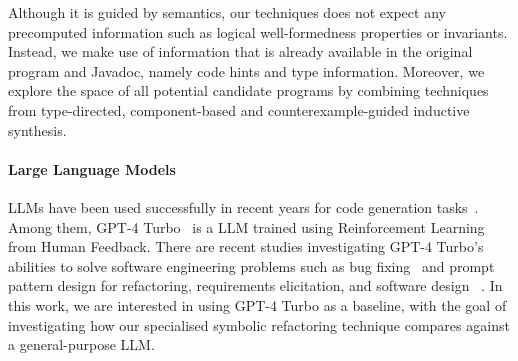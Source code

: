 \documentclass[sigconf,review,anonymous]{acmart}
\begin{document}
%
%
%

Although it is guided by semantics, our techniques does not expect any
precomputed information such as logical well-formedness properties or
invariants. Instead, we make use of information that is already
available in the original program and Javadoc, namely code hints and
type information. Moreover, we explore the space of all potential
candidate programs by combining techniques from type-directed,
component-based and counterexample-guided inductive synthesis.

\paragraph{Large Language Models}
LLMs have been used successfully in recent years for code generation tasks~\cite{DBLP:journals/corr/abs-2108-07732,DBLP:journals/corr/abs-2302-05527,DBLP:journals/corr/abs-2202-13169}.
Among them, GPT-4 Turbo~\cite{chatgpt} is a LLM trained using Reinforcement Learning from Human Feedback.
There are recent studies investigating GPT-4 Turbo's abilities to solve software engineering problems such as bug fixing~\cite{sobania2023analysis,chatgptbugs} and 
prompt pattern design for refactoring, requirements elicitation, and software design ~\cite{white2023chatgpt}.
In this work, we are interested in using GPT-4 Turbo as a baseline, with the goal of investigating how our specialised symbolic refactoring technique compares
against a general-purpose LLM.
\end{document}
